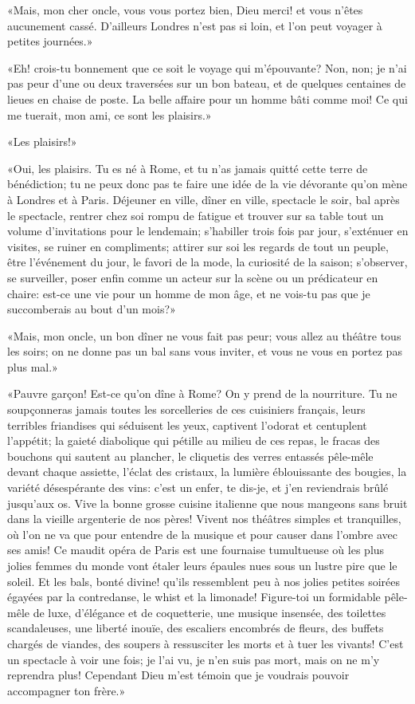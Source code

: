 «Mais, mon cher oncle, vous vous portez bien, Dieu merci! et vous n'êtes
aucunement cassé. D'ailleurs Londres n'est pas si loin, et l'on peut
voyager à petites journées.»

«Eh! crois-tu bonnement que ce soit le voyage qui m'épouvante? Non, non;
je n'ai pas peur d'une ou deux traversées sur un bon bateau, et de
quelques centaines de lieues en chaise de poste. La belle affaire pour
un homme bâti comme moi! Ce qui me tuerait, mon ami, ce sont les
plaisirs.»

«Les plaisirs!»

«Oui, les plaisirs. Tu es né à Rome, et tu n'as jamais quitté cette
terre de bénédiction; tu ne peux donc pas te faire une idée de la vie
dévorante qu'on mène à Londres et à Paris. Déjeuner en ville, dîner en
ville, spectacle le soir, bal après le spectacle, rentrer chez soi rompu
de fatigue et trouver sur sa table tout un volume d'invitations pour le
lendemain; s'habiller trois fois par jour, s'exténuer en visites, se
ruiner en compliments; attirer sur soi les regards de tout un peuple,
être l'événement du jour, le favori de la mode, la curiosité de la
saison; s'observer, se surveiller, poser enfin comme un acteur sur la
scène ou un prédicateur en chaire: est-ce une vie pour un homme de mon
âge, et ne vois-tu pas que je succomberais au bout d'un mois?»

«Mais, mon oncle, un bon dîner ne vous fait pas peur; vous allez au
théâtre tous les soirs; on ne donne pas un bal sans vous inviter, et
vous ne vous en portez pas plus mal.»

«Pauvre garçon! Est-ce qu'on dîne à Rome? On y prend de la nourriture.
Tu ne soupçonneras jamais toutes les sorcelleries de ces cuisiniers
français, leurs terribles friandises qui séduisent les yeux, captivent
l'odorat et centuplent l'appétit; la gaieté diabolique qui pétille au
milieu de ces repas, le fracas des bouchons qui sautent au plancher, le
cliquetis des verres entassés pêle-mêle devant chaque assiette, l'éclat
des cristaux, la lumière éblouissante des bougies, la variété
désespérante des vins: c'est un enfer, te dis-je, et j'en reviendrais
brûlé jusqu'aux os. Vive la bonne grosse cuisine italienne que nous
mangeons sans bruit dans la vieille argenterie de nos pères! Vivent nos
théâtres simples et tranquilles, où l'on ne va que pour entendre de la
musique et pour causer dans l'ombre avec ses amis! Ce maudit opéra de
Paris est une fournaise tumultueuse où les plus jolies femmes du monde
vont étaler leurs épaules nues sous un lustre pire que le soleil. Et les
bals, bonté divine! qu'ils ressemblent peu à nos jolies petites soirées
égayées par la contredanse, le whist et la limonade! Figure-toi un
formidable pêle-mêle de luxe, d'élégance et de coquetterie, une musique
insensée, des toilettes scandaleuses, une liberté inouïe, des escaliers
encombrés de fleurs, des buffets chargés de viandes, des soupers à
ressusciter les morts et à tuer les vivants! C'est un spectacle à voir
une fois; je l'ai vu, je n'en suis pas mort, mais on ne m'y reprendra
plus! Cependant Dieu m'est témoin que je voudrais pouvoir accompagner
ton frère.»

